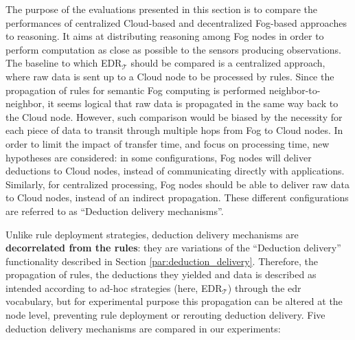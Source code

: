 \documentclass[sw]{iosart2x}
\newcommand{\edrt}{EDR$_{\mathcal{T}}$\xspace}
\begin{document}
The purpose of the evaluations presented in this section is to compare the performances of centralized Cloud-based and decentralized Fog-based approaches to reasoning.
It aims at distributing reasoning among Fog nodes in order to perform computation as close as possible to the sensors producing observations.
The baseline to which \edrt should be compared is a centralized approach, where raw data is sent up to a Cloud node to be processed by rules.
Since the propagation of rules for semantic Fog computing is performed neighbor-to-neighbor, it seems logical that raw data is propagated in the same way back to the Cloud node.
However, such comparison would be biased by the necessity for each piece of data to transit through multiple hops from Fog to Cloud nodes.
In order to limit the impact of transfer time, and focus on processing time, new hypotheses are considered: in some configurations, Fog nodes will deliver deductions to Cloud nodes, instead of communicating directly with applications.
Similarly, for centralized processing, Fog nodes should be able to deliver raw data to Cloud nodes, instead of an indirect propagation.
These different configurations are referred to as ``Deduction delivery mechanisms''.

Unlike rule deployment strategies, deduction delivery mechanisms are \textbf{decorrelated from the rules}: they are variations of the ``Deduction delivery'' functionality described in Section \textsection \ref{par:deduction_delivery}.
Therefore, the propagation of rules, the deductions they yielded and data is described as intended according to ad-hoc strategies (here, \edrt) through the \gls{edr} vocabulary, but for experimental purpose this propagation can be altered at the node level, preventing rule deployment or rerouting deduction delivery.
Five deduction delivery mechanisms are compared in our experiments: 
\end{document}
